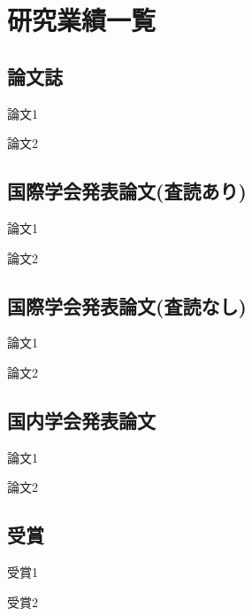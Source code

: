 \documentclass[12pt,a4j]{jreport}
\begin{document}
\renewcommand{\bibname}{参考文献} %



\chapter*{研究業績一覧}

\section*{論文誌}
\begin{enumerate}[{[1]}]
 \item 論文1
 \item 論文2
\end{enumerate}

\section*{国際学会発表論文(査読あり)}
\begin{enumerate}[{[1]}]
 \item 論文1
 \item 論文2
\end{enumerate}

\section*{国際学会発表論文(査読なし)}
\begin{enumerate}[{[1]}]
 \item 論文1
 \item 論文2
\end{enumerate}

\section*{国内学会発表論文}
\begin{enumerate}[{[1]}]
 \item 論文1
 \item 論文2
\end{enumerate}

\section*{受賞}
\begin{enumerate}[{[1]}]
 \item 受賞1
 \item 受賞2
\end{enumerate}

\end{document}
